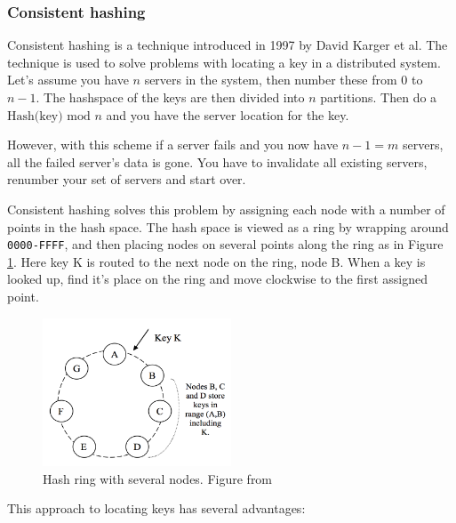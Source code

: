 \subsubsection{Consistent hashing}
Consistent hashing is a technique introduced in 1997 by David Karger et al.\cite{Karger97consistenthashing}
The technique is used to solve problems with locating a key in a distributed system.
Let's assume you have $n$ servers in the system, then number these from $0$ to $n-1$.
The hashspace of the keys are then divided into $n$ partitions. Then do a $\textrm{Hash(key) mod } n$ and you have the server location for the key.

However, with this scheme if a server fails and you now have $n-1=m$ servers, all the failed server's data is gone.
You have to invalidate all existing servers, renumber your set of servers and start over.

Consistent hashing solves this problem by assigning each node with a number of points in the hash space.
The hash space is viewed as a ring by wrapping around \texttt{0000-FFFF}, and then placing nodes on several points along the ring as in Figure \ref{fig:hashring}. Here key K is routed to the next node on the ring, node B.
When a key is looked up, find it's place on the ring and move clockwise to the first assigned point.
\begin{figure}[h]
    \centering
    \includegraphics[width=0.5\textwidth]{introduction/hashring}
    \caption{Hash ring with several nodes. Figure from \cite{dynamo}}
    \label{fig:hashring}
\end{figure}

This approach to locating keys has several advantages:

